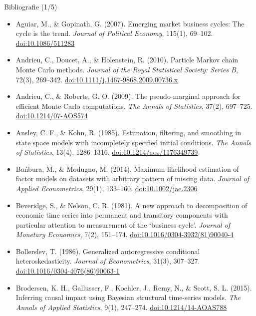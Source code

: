 \begin{frame}{Bibliografie (1/5)}
\itemsize{\tiny}
\begin{itemize}
    \item Aguiar, M., \& Gopinath, G. (2007). Emerging market business cycles: The cycle is the trend. \textit{Journal of Political Economy}, 115(1), 69--102. \href{https://doi.org/10.1086/511283}{doi:10.1086/511283}
    \item Andrieu, C., Doucet, A., \& Holenstein, R. (2010). Particle Markov chain Monte Carlo methods. \textit{Journal of the Royal Statistical Society: Series B}, 72(3), 269--342. \href{https://doi.org/10.1111/j.1467-9868.2009.00736.x}{doi:10.1111/j.1467-9868.2009.00736.x}
    \item Andrieu, C., \& Roberts, G. O. (2009). The pseudo-marginal approach for efficient Monte Carlo computations. \textit{The Annals of Statistics}, 37(2), 697--725. \href{https://doi.org/10.1214/07-AOS574}{doi:10.1214/07-AOS574}
    \item Ansley, C. F., \& Kohn, R. (1985). Estimation, filtering, and smoothing in state space models with incompletely specified initial conditions. \textit{The Annals of Statistics}, 13(4), 1286--1316. \href{https://doi.org/10.1214/aos/1176349739}{doi:10.1214/aos/1176349739}
    \item Bańbura, M., \& Modugno, M. (2014). Maximum likelihood estimation of factor models on datasets with arbitrary pattern of missing data. \textit{Journal of Applied Econometrics}, 29(1), 133--160. \href{https://doi.org/10.1002/jae.2306}{doi:10.1002/jae.2306}
    \item Beveridge, S., \& Nelson, C. R. (1981). A new approach to decomposition of economic time series into permanent and transitory components with particular attention to measurement of the `business cycle'. \textit{Journal of Monetary Economics}, 7(2), 151--174. \href{https://doi.org/10.1016/0304-3932(81)90040-4}{doi:10.1016/0304-3932(81)90040-4}
    \item Bollerslev, T. (1986). Generalized autoregressive conditional heteroskedasticity. \textit{Journal of Econometrics}, 31(3), 307--327. \href{https://doi.org/10.1016/0304-4076(86)90063-1}{doi:10.1016/0304-4076(86)90063-1}
    \item Brodersen, K. H., Gallusser, F., Koehler, J., Remy, N., \& Scott, S. L. (2015). Inferring causal impact using Bayesian structural time-series models. \textit{The Annals of Applied Statistics}, 9(1), 247--274. \href{https://doi.org/10.1214/14-AOAS788}{doi:10.1214/14-AOAS788}

\end{itemize}
\end{frame}
